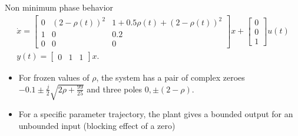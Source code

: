 \begin{frame}{Non minimum phase behavior}
\begin{gather}
\dot{x} = \begin{bmatrix} \label{eq:ex_minph}
0 & (2-\rho(t))^2 & 1+0.5\rho(t)+(2-\rho(t))^2\\
1 &  0 & 0.2\\
0 &  0  & 0
\end{bmatrix}x + \begin{bmatrix}
0\\
0\\
1
\end{bmatrix}u(t)\\
y(t) = \begin{bmatrix}
0 & 1 & 1
\end{bmatrix} x.
\end{gather}
    \begin{itemize}
        \item For frozen values of $\rho$, the system has a pair of complex zeroes $-0.1 \pm \frac{j}{2} \sqrt{2\rho+\frac{99}{25}}$ and three poles $0, \pm (2 - \rho)$.
        \item For a specific parameter trajectory, the plant gives a bounded output for an unbounded input
        (blocking effect of a zero\autocite{hang2007})
    \end{itemize}
\end{frame}

